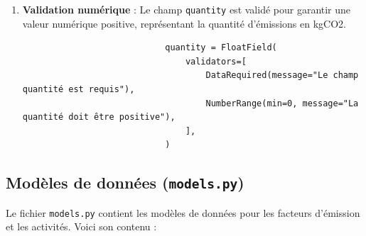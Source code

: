 \documentclass[a4paper,11pt]{article}
\begin{document}
\begin{enumerate}
                    \item \textbf{Validation numérique} : Le champ \texttt{quantity} est validé pour garantir une valeur numérique positive, représentant la quantité d'émissions en kgCO2.
                    \begin{tcolorbox}[colback=lightgray!6, colframe=black, left=-45mm, right=5mm, top=2mm, bottom=0mm, boxrule=0.1mm]
                        \begin{verbatim}
                            quantity = FloatField(
                                validators=[
                                    DataRequired(message="Le champ quantité est requis"),
                                    NumberRange(min=0, message="La quantité doit être positive"),
                                ],
                            )
                        \end{verbatim}
                    \end{tcolorbox}
                \end{enumerate}

            \subsection{Modèles de données (\texttt{models.py})}
                \noindent Le fichier \texttt{models.py} contient les modèles de données pour les facteurs d'émission et les activités. Voici son contenu :

                
\end{document}

